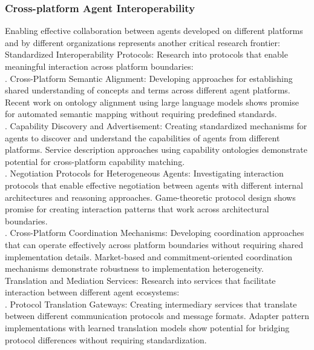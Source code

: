 \subsubsection{Cross-platform Agent Interoperability}
Enabling effective collaboration between agents developed on different platforms and by different organizations represents another critical research frontier:\\ \newline
Standardized Interoperability Protocols: Research into protocols that enable meaningful interaction across platform boundaries:\\ . Cross-Platform Semantic Alignment: Developing approaches for establishing shared understanding of concepts and terms across different agent platforms. Recent work on ontology alignment using large language models shows promise for automated semantic mapping without requiring predefined standards.\\ . Capability Discovery and Advertisement: Creating standardized mechanisms for agents to discover and understand the capabilities of agents from different platforms. Service description approaches using capability ontologies demonstrate potential for cross-platform capability matching.\\ . Negotiation Protocols for Heterogeneous Agents: Investigating interaction protocols that enable effective negotiation between agents with different internal architectures and reasoning approaches. Game-theoretic protocol design shows promise for creating interaction patterns that work across architectural boundaries.\\ . Cross-Platform Coordination Mechanisms: Developing coordination approaches that can operate effectively across platform boundaries without requiring shared implementation details. Market-based and commitment-oriented coordination mechanisms demonstrate robustness to implementation heterogeneity.\\ \newline
Translation and Mediation Services: Research into services that facilitate interaction between different agent ecosystems:\\ . Protocol Translation Gateways: Creating intermediary services that translate between different communication protocols and message formats. Adapter pattern implementations with learned translation models show potential for bridging protocol differences without requiring standardization.\\ \newline
